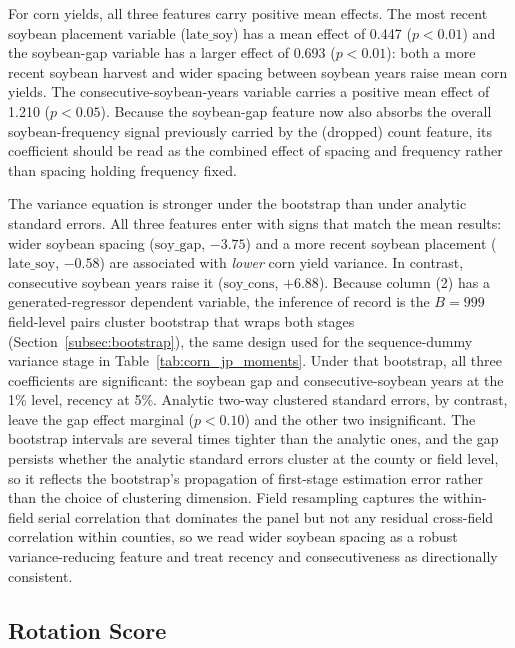 \documentclass[12pt,letterpaper]{article}
\theoremstyle{remark}
\theoremstyle{remark}
\theoremstyle{plain}
\theoremstyle{definition}
\begin{document}
For corn yields, all three features carry positive mean effects. The most recent soybean placement variable ($\text{late\_soy}$) has a mean effect of 0.447 ($p<0.01$) and the soybean-gap variable has a larger effect of 0.693 ($p<0.01$): both a more recent soybean harvest and wider spacing between soybean years raise mean corn yields. The consecutive-soybean-years variable carries a positive mean effect of 1.210 ($p<0.05$). Because the soybean-gap feature now also absorbs the overall soybean-frequency signal previously carried by the (dropped) count feature, its coefficient should be read as the combined effect of spacing and frequency rather than spacing holding frequency fixed.

The variance equation is stronger under the bootstrap than under analytic standard errors. All three features enter with signs that match the mean results: wider soybean spacing ($\text{soy\_gap}$, $-3.75$) and a more recent soybean placement ($\text{late\_soy}$, $-0.58$) are associated with \emph{lower} corn yield variance. In contrast, consecutive soybean years raise it ($\text{soy\_cons}$, $+6.88$). Because column (2) has a generated-regressor dependent variable, the inference of record is the $B=999$ field-level pairs cluster bootstrap that wraps both stages (Section~\ref{subsec:bootstrap}), the same design used for the sequence-dummy variance stage in Table~\ref{tab:corn_jp_moments}. Under that bootstrap, all three coefficients are significant: the soybean gap and consecutive-soybean years at the 1\% level, recency at 5\%. Analytic two-way clustered standard errors, by contrast, leave the gap effect marginal ($p<0.10$) and the other two insignificant. The bootstrap intervals are several times tighter than the analytic ones, and the gap persists whether the analytic standard errors cluster at the county or field level, so it reflects the bootstrap's propagation of first-stage estimation error rather than the choice of clustering dimension. Field resampling captures the within-field serial correlation that dominates the panel but not any residual cross-field correlation within counties, so we read wider soybean spacing as a robust variance-reducing feature and treat recency and consecutiveness as directionally consistent.

\subsection{\label{subsec:rot_score_res}Rotation Score}
\end{document}
